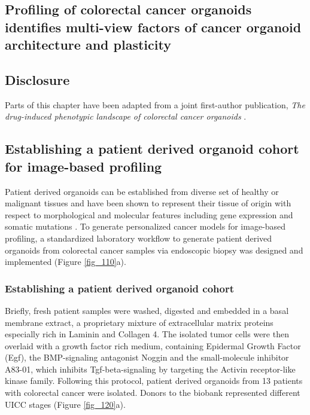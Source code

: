 \begin{flushleft}
\chapter{Profiling of colorectal cancer organoids identifies multi-view factors of cancer organoid architecture and plasticity}


\section{Disclosure}
Parts of this chapter have been adapted from a joint first-author publication, \textit{The drug-induced phenotypic landscape of colorectal cancer organoids} \citep{betgeDruginducedPhenotypicLandscape2022}. 

\section{Establishing a patient derived organoid cohort for image-based profiling}

Patient derived organoids can be established from diverse set of healthy or malignant tissues and have been shown to represent their tissue of origin with respect to morphological and molecular features including gene expression and somatic mutations \citep{Fujii2016-ax, vandeweteringProspectiveDerivationLiving2015, satoLongtermExpansionEpithelial2011}. To generate personalized cancer models for image-based profiling, a standardized laboratory workflow to generate patient derived organoids from colorectal cancer samples via endoscopic biopsy was designed and implemented (Figure \ref{fig_110}a). 

\subsection{Establishing a patient derived organoid cohort}

Briefly, fresh patient samples were washed, digested and embedded in a basal membrane extract, a proprietary mixture of extracellular matrix proteins especially rich in Laminin and Collagen 4. The isolated tumor cells were then overlaid with a growth factor rich medium, containing Epidermal Growth Factor (Egf), the BMP-signaling antagonist Noggin and the small-molecule inhibitor A83-01, which inhibits Tgf-beta-signaling by targeting the Activin receptor-like kinase family. Following this protocol, patient derived organoids from 13 patients with colorectal cancer were isolated. Donors to the biobank represented different UICC stages (Figure \ref{fig_120}a). 


\end{flushleft}
